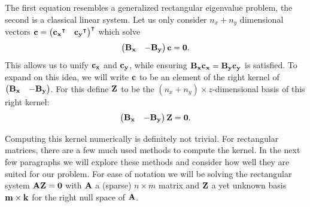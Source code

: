 The first equation resembles a generalized rectangular eigenvalue problem, the second is a classical linear system. Let us only consider $n_x + n_y$ dimensional vectors $\vb{c} = {\begin{pmatrix}{\vb{c_x}}^\intercal & {\vb{c_y}}^\intercal \end{pmatrix}}^\intercal$ which solve
$$
    \begin{pmatrix}\vb{B_x} & -\vb{B_y} \end{pmatrix} \vb{c} = \vb{0}\text{.}
$$
This allows us to unify $\vb{c_x}$ and $\vb{c_y}$, while ensuring $\vb{B_x} \vb{c_x} = \vb{B_y} \vb{c_y}$ is satisfied. To expand on this idea, we will write $\vb{c}$ to be an element of the right kernel of  $\begin{pmatrix}\vb{B_x} & -\vb{B_y} \end{pmatrix}$. For this define $\vb{Z}$ to be the $(n_x + n_y) \times z$-dimensional basis of this right kernel:
\begin{equation}\label{equ:c4_null_space_kernel}
    \begin{pmatrix}\vb{B_x} & -\vb{B_y} \end{pmatrix} \vb{Z} = \vb{0}\text{.}
\end{equation}

Computing this kernel numerically is definitely not trivial. For rectangular matrices, there are a few much used methods to compute the kernel. In the next few paragraphs we will explore these methods and consider how well they are suited for our problem. For ease of notation we will be solving the rectangular system $\vb{A} \vb{Z} = \vb{0}$ with $\vb{A}$ a (sparse) $n\times m$ matrix and $\vb{Z}$ a yet unknown basis $\vb{m} \times \vb{k}$ for the right null space of $\vb{A}$.


